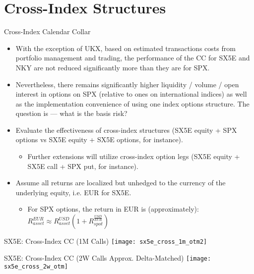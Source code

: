 \documentclass{beamer}
\begin{document}
\section{Cross-Index Structures}

\begin{frame}{Cross-Index Calendar Collar}
\begin{itemize}
\item With the exception of UKX, based on estimated transactions costs from portfolio management and trading, the performance of the CC for SX5E and NKY are not reduced significantly more than they are for SPX. 
\item Nevertheless, there remains significantly higher liquidity / volume / open interest in options on SPX (relative to ones on international indices) as well as the implementation convenience of using one index options structure. The question is --- what is the basis risk?
\item Evaluate the effectiveness of cross-index structures (SX5E equity + SPX options vs SX5E equity + SX5E options, for instance).
	\begin{itemize}
	\item Further extensions will utilize cross-index option legs (SX5E equity + SX5E call + SPX put, for instance).
	\end{itemize}
\item Assume all returns are localized but unhedged to the currency of the underlying equity, i.e. EUR for SX5E. 
	\begin{itemize}
	\item For SPX options, the return in EUR is (approximately): $R_{asset}^{EUR} \approx R_{asset}^{USD}(1+R_{spot}^{\frac{USD}{EUR}})$
	\end{itemize}
\end{itemize}
\end{frame}

\begin{frame}{SX5E: Cross-Index CC (1M Calls)}
\texttt{[image: sx5e\_cross\_1m\_otm2]}
\end{frame}

\begin{frame}{SX5E: Cross-Index CC (2W Calls Approx. Delta-Matched)}
\texttt{[image: sx5e\_cross\_2w\_otm]}
\end{frame}
\end{document}
